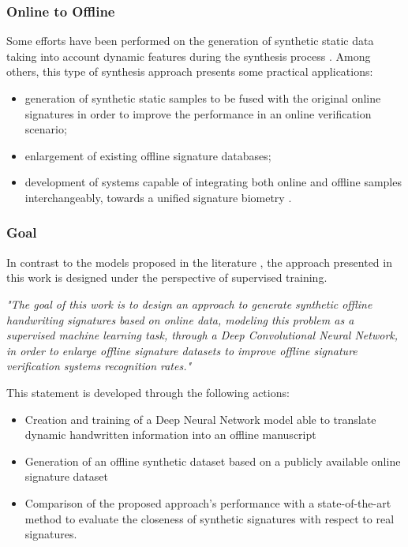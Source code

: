 \documentclass{beamer}
\begin{document}
\begin{frame}
\frametitle{Online to Offline}
Some efforts have been performed on the generation of synthetic static data taking into account dynamic features during the synthesis process \parencite{diaz2014generation}. Among others, this type of synthesis approach presents some practical applications:
\begin{itemize}
  \item generation of synthetic static samples to be fused with the original online signatures in order to improve the performance in an online verification scenario;
  \item enlargement of existing offline signature databases;
  \item development of systems capable of integrating both online and offline samples interchangeably, towards a unified signature biometry \parencite{chapter}.
\end{itemize}
\end{frame}

\begin{frame}
\frametitle{Goal}


In contrast to the models proposed in the literature \parencite{ferrer2013synthetic, ferrer2013realistic, diaz2014generation}, the approach presented in this work is designed under the perspective of supervised training. 

\textit{"The goal of this work is to design an approach to generate synthetic offline handwriting signatures based on online data, modeling this problem as a supervised machine learning task, through a Deep Convolutional Neural Network, in order to enlarge offline signature datasets to improve offline signature verification systems recognition rates."}

This statement is developed through the following actions:
\begin{itemize}
\item Creation and training of a Deep Neural Network model able to translate dynamic handwritten information into an offline manuscript
\item Generation of an offline synthetic dataset based on a publicly available online signature dataset
\item Comparison of the proposed approach’s performance with a state-of-the-art method to evaluate the closeness of synthetic signatures with respect to real signatures. 
\end{itemize}
\end{frame}
\end{document}
